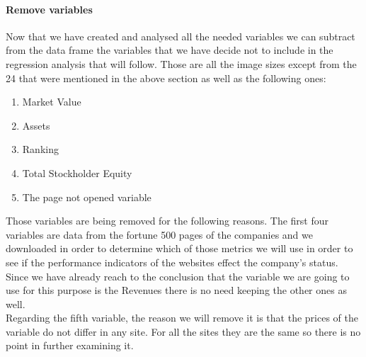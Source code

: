 \documentclass{article}
\begin{document}
\paragraph{Remove variables}
Now that we have created and analysed all the needed variables we can subtract from the data frame the variables that we have decide not to include in the regression analysis that will follow. Those are all the image sizes except from the 24 that were mentioned in the above section as well as the following ones:
\begin{enumerate}
\item Market Value 
\item Assets
\item Ranking
\item Total Stockholder Equity
\item The page not opened variable
\end{enumerate}
Those variables are being removed for the following reasons. The first four variables are data from the fortune 500 pages of the companies and we downloaded in order to determine which of those metrics we will use in order to see if the performance indicators of the websites effect the company's status. Since we have already reach to the conclusion that the variable we are going to use for this purpose is the Revenues there is no need keeping the other ones as well.\\
Regarding the fifth variable, the reason we will remove it is that the prices of the variable do not differ in any site. For all the sites they are the same so there is no point in further examining it.
\end{document}
